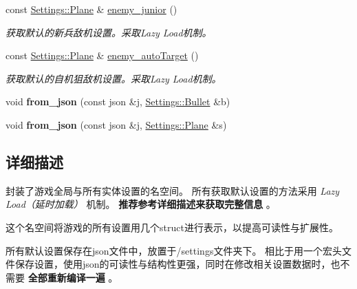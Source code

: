 \begin{DoxyCompactItemize}
const \hyperlink{struct_settings_1_1_plane}{Settings\+::\+Plane} \& \hyperlink{namespace_settings_a5d571065d327daba740814f8e90261f5}{enemy\+\_\+junior} ()
\begin{DoxyCompactList}\small\item\em 获取默认的新兵敌机设置。采取\+Lazy Load机制。 \end{DoxyCompactList}\item 
\mbox{\label{namespace_settings_a77e282eadc82f97cb15c2c3eef3c535b}} 
const \hyperlink{struct_settings_1_1_plane}{Settings\+::\+Plane} \& \hyperlink{namespace_settings_a77e282eadc82f97cb15c2c3eef3c535b}{enemy\+\_\+auto\+Target} ()
\begin{DoxyCompactList}\small\item\em 获取默认的自机狙敌机设置。采取\+Lazy Load机制。 \end{DoxyCompactList}\item 
\mbox{\label{namespace_settings_a42e5acb521fa66b1f2311a896df95a98}} 
void {\bfseries from\+\_\+json} (const json \&j, \hyperlink{struct_settings_1_1_bullet}{Settings\+::\+Bullet} \&b)
\item 
\mbox{\label{namespace_settings_aaba1604e449415b4bcbbb0a6e50a0ac9}} 
void {\bfseries from\+\_\+json} (const json \&j, \hyperlink{struct_settings_1_1_plane}{Settings\+::\+Plane} \&s)
\end{DoxyCompactItemize}


\subsection{详细描述}
封装了游戏全局与所有实体设置的名空间。 所有获取默认设置的方法采用 {\itshape Lazy Load（延时加载）} 机制。 {\bfseries 推荐参考详细描述来获取完整信息} 。 

这个名空间将游戏的所有设置用几个struct进行表示，以提高可读性与扩展性。

所有默认设置保存在json文件中，放置于/settings文件夹下。 相比于用一个宏头文件保存设置，使用json的可读性与结构性更强，同时在修改相关设置数据时，也不需要 {\bfseries 全部重新编译一遍} 。

